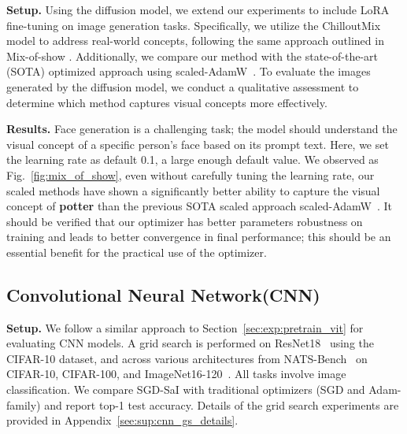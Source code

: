 \textbf{Setup.} 
Using the diffusion model, we extend our experiments to include LoRA fine-tuning on image generation tasks. Specifically, we utilize the ChilloutMix model to address real-world concepts, following the same approach outlined in Mix-of-show \cite{gu2024mix, zhang2024riemannian}. Additionally, we compare our method with the state-of-the-art (SOTA) optimized approach using scaled-AdamW~\cite{zhang2024riemannian}. To evaluate the images generated by the diffusion model, we conduct a qualitative assessment to determine which method captures visual concepts more effectively.

\textbf{Results.}
Face generation is a challenging task; the model should understand the visual concept of a specific person's face based on its prompt text. Here, we set the learning rate as default 0.1, a large enough default value. We observed as Fig.~\ref{fig:mix_of_show}, even without carefully tuning the learning rate, our scaled methods have shown a significantly better ability to capture the visual concept of \textbf{potter} than the previous SOTA scaled approach scaled-AdamW~\cite{zhang2024riemannian}. It should be verified that our optimizer has better parameters robustness on training and leads to better convergence in final performance; this should be an essential benefit for the practical use of the optimizer. 




\subsection{Convolutional Neural Network(CNN)} \label{sec:exp:pretrain_cnn} 

\textbf{Setup.} 
We follow a similar approach to Section~\ref{sec:exp:pretrain_vit} for evaluating CNN models. A grid search is performed on ResNet18~\cite{he2015deepresiduallearningimage} using the CIFAR-10 dataset, and across various architectures from NATS-Bench~\cite{dong2021nats} on CIFAR-10, CIFAR-100, and ImageNet16-120~\cite{krizhevsky2009learning, chrabaszcz2017downsampled}. All tasks involve image classification. We compare SGD-SaI with traditional optimizers (SGD and Adam-family) and report top-1 test accuracy. Details of the grid search experiments are provided in Appendix~\ref{see:sup:cnn_gs_details}.

